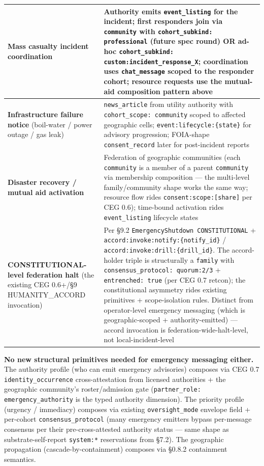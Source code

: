 \documentclass[11pt]{article}
\begin{document}
{\begin{longtable}{|p{8.0cm}|p{8.0cm}|}
\textbf{Mass casualty incident coordination} & Authority emits \texttt{event\_listing} for the incident; first responders join via \texttt{community} with \texttt{cohort\_subkind: professional} (future spec round) OR ad-hoc \texttt{cohort\_subkind: custom:incident\_response\_X}; coordination uses \texttt{chat\_message} scoped to the responder cohort; resource requests use the mutual-aid composition pattern above \\ \hline
\textbf{Infrastructure failure notice} (boil-water / power outage / gas leak) & \texttt{news\_article} from utility authority with \texttt{cohort\_scope: community} scoped to affected geographic cells; \texttt{event:lifecycle:\{state\}} for advisory progression; FOIA-shape \texttt{consent\_record} later for post-incident reports \\ \hline
\textbf{Disaster recovery / mutual aid activation} & Federation of geographic communities (each \texttt{community} is a member of a parent \texttt{community} via membership composition — the multi-level family/community shape works the same way; resource flow rides \texttt{consent:scope:[share]} per CEG 0.6); time-bound activation rides \texttt{event\_listing} lifecycle states \\ \hline
\textbf{CONSTITUTIONAL-level federation halt} (the existing CEG 0.6+/§9 HUMANITY\_ACCORD invocation) & Per §9.2 \texttt{EmergencyShutdown CONSTITUTIONAL} + \texttt{accord:invoke:notify:\{notify\_id\}} / \texttt{accord:invoke:drill:\{drill\_id\}}. The accord-holder triple is structurally a \texttt{family} with \texttt{consensus\_protocol: quorum:2/3} + \texttt{entrenched: true} (per CEG 0.7 retcon); the constitutional asymmetry rides existing primitives + scope-isolation rules. Distinct from operator-level emergency messaging (which is geographic-scoped + authority-emitted) — accord invocation is federation-wide-halt-level, not local-incident-level \\ \hline
\end{longtable}}


\textbf{No new structural primitives needed for emergency messaging either.} The authority profile (who can emit emergency advisories) composes via CEG 0.7 \texttt{identity\_occurrence} cross-attestation from licensed authorities + the geographic community's roster/admission gate (\texttt{partner\_role: emergency\_authority} is the typed authority dimension). The priority profile (urgency / immediacy) composes via existing \texttt{oversight\_mode} envelope field + per-cohort \texttt{consensus\_protocol} (many emergency emitters bypass per-message consensus per their pre-cross-attested authority status — same shape as substrate-self-report \texttt{system:*} reservations from §7.2). The geographic propagation (cascade-by-containment) composes via §0.8.2 containment semantics.
\end{document}
